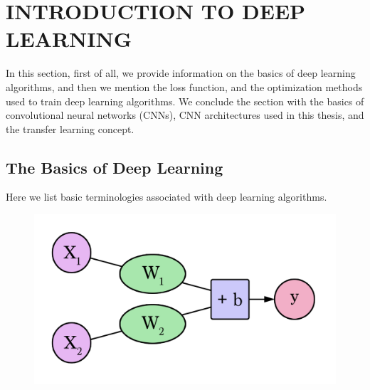 \chapter{INTRODUCTION TO DEEP LEARNING}
\label{ch:CH3}

In this section, first of all, we provide information on the basics of deep learning algorithms, and then we mention the loss function, and the optimization methods used to train deep learning algorithms. We conclude the section with the basics of convolutional neural networks (CNNs), CNN architectures used in this thesis, and the transfer learning concept.

\section{The Basics of Deep Learning}

Here we list basic terminologies associated with deep learning algorithms.

\begin{figure}[h]
\centering
\includegraphics[width=.8\linewidth]{fig/NNs_2_variables.png}
\label{fig:basic_neuron}
\end{figure}


